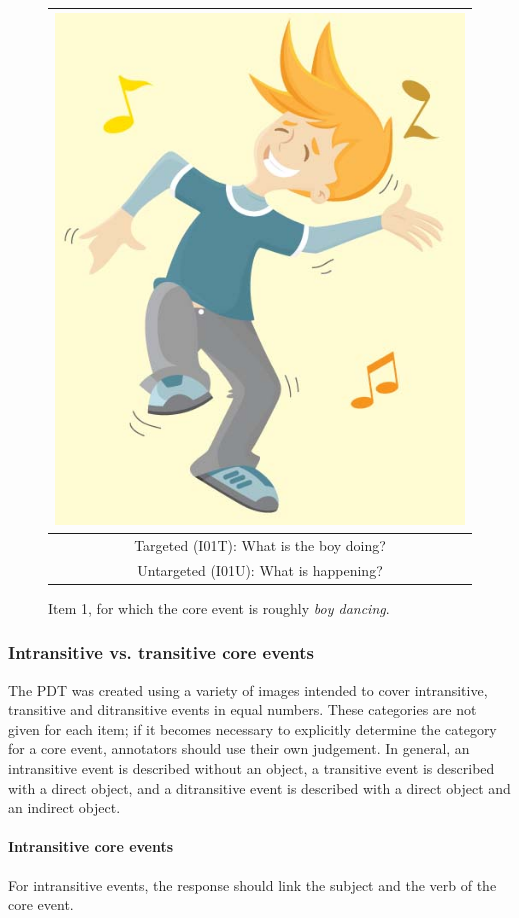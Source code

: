 \documentclass[12pt,notitlepage]{article}
\begin{document}
\begin{figure}[h]
\begin{center}
\begin{tabular}{|c|}
\hline
\includegraphics[width=0.4\columnwidth,trim=0 0 0 -3]{figures/I01.jpg}\\
\hline
Targeted (I01T): What is the boy doing?\\
\hline
Untargeted (I01U): What is happening? \\
\hline
\end{tabular}
\end{center}
\caption{Item 1, for which the core event is roughly \textit{boy dancing}.}
\label{fig:dance}
\end{figure}

\subsubsection{Intransitive vs. transitive core events} The PDT was created using a variety of images intended to cover intransitive, transitive and ditransitive events in equal numbers. These categories are not given for each item; if it becomes necessary to explicitly determine the category for a core event, annotators should use their own judgement. In general, an intransitive event is described without an object, a transitive event is described with a direct object, and a ditransitive event is described with a direct object and an indirect object.

\paragraph{Intransitive core events} For intransitive events, the response should link the subject and the verb of the core event.
\end{document}
